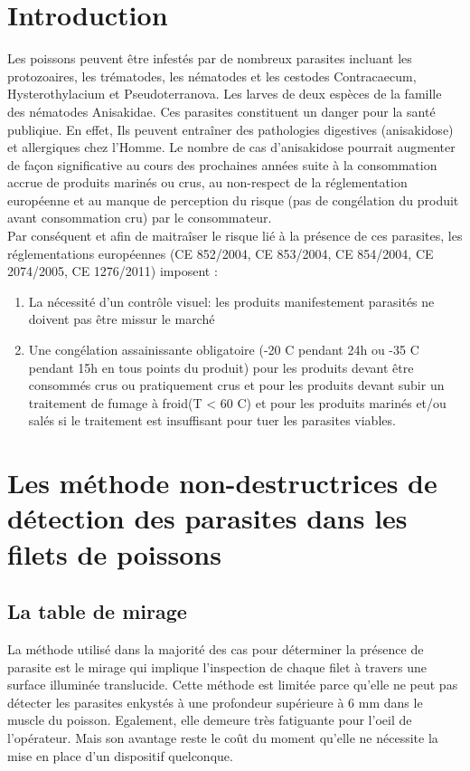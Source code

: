 \documentclass[12pt,a4paper]{article}
\begin{document}
\section*{Introduction}
 Les poissons peuvent être infestés par de nombreux parasites incluant les protozoaires, les trématodes, les nématodes et les cestodes Contracaecum, Hysterothylacium
et Pseudoterranova. Les larves de deux espèces de la famille des nématodes Anisakidae. Ces parasites constituent un danger pour la santé publiqiue. En effet,  Ils peuvent entraîner des
pathologies digestives (anisakidose) et allergiques chez
l’Homme. Le nombre de cas d’anisakidose pourrait
augmenter de façon significative au cours des prochaines
années suite à la consommation accrue de produits marinés
ou crus, au non-respect de la réglementation européenne
et au manque de perception du risque (pas de congélation
du produit avant consommation cru) par le consommateur.\\
 Par conséquent et afin de maitraîser le risque lié à la présence de ces parasites,
les réglementations européennes (CE 852/2004, CE 853/2004,
CE 854/2004, CE 2074/2005, CE 1276/2011) imposent :
\begin{enumerate}
\item La nécessité d’un contrôle visuel: les produits manifestement parasités ne doivent
pas être missur le marché
 \item Une congélation assainissante obligatoire
(-20 \degree C pendant 24h ou -35 \degree C pendant 15h en tous points du produit)
pour les produits devant être consommés crus ou pratiquement crus
et pour les produits devant subir un traitement de fumage à froid(T < 60 \degree C) et pour les produits marinés et/ou salés si le traitement est insuffisant pour tuer les parasites viables.
\end{enumerate}

\newpage

\section {Les  méthode  non-destructrices de détection des parasites dans les filets de poissons}
\subsection{La table de mirage}
La méthode utilisé dans la majorité des cas pour déterminer la présence de parasite est le mirage qui implique l’inspection de chaque filet à travers une surface illuminée translucide. Cette méthode est limitée parce qu’elle ne peut pas détecter les parasites enkystés à une profondeur supérieure à 6 mm dans le muscle du poisson. Egalement, elle demeure très fatiguante pour l'oeil de l'opérateur. Mais son avantage reste le coût du moment qu'elle ne nécessite la mise en place d'un dispositif quelconque.
\end{document}
